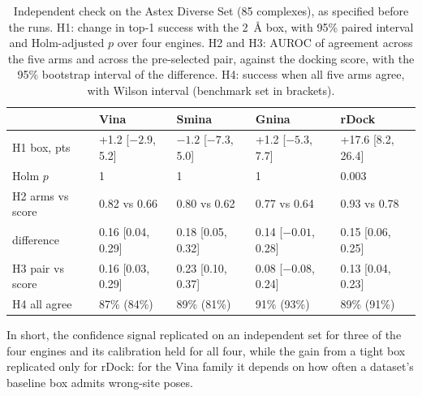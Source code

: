 \begin{table}[h]
  \centering
  \caption{Independent check on the Astex Diverse Set (85 complexes), as specified before the
    runs. H1: change in top-1 success with the \SI{2}{\angstrom} box, with 95\% paired
    interval and Holm-adjusted $p$ over four engines. H2 and H3: AUROC of agreement across the
    five arms and across the pre-selected pair, against the docking score, with the 95\%
    bootstrap interval of the difference. H4: success when all five arms agree, with Wilson
    interval (benchmark set in brackets).}
  \label{tab:astex}
  \small
  \setlength{\tabcolsep}{3.5pt}
  \begin{tabular}{lllll}
    \toprule
     & Vina & Smina & Gnina & rDock \\
    \midrule
    H1 box, pts & +1.2 [$-2.9$, 5.2] & $-1.2$ [$-7.3$, 5.0] & +1.2 [$-5.3$, 7.7] & +17.6 [8.2, 26.4] \\
    \quad Holm $p$ & 1 & 1 & 1 & 0.003 \\
    H2 arms vs score & 0.82 vs 0.66 & 0.80 vs 0.62 & 0.77 vs 0.64 & 0.93 vs 0.78 \\
    \quad difference & 0.16 [0.04, 0.29] & 0.18 [0.05, 0.32] & 0.14 [$-0.01$, 0.28] & 0.15 [0.06, 0.25] \\
    H3 pair vs score & 0.16 [0.03, 0.29] & 0.23 [0.10, 0.37] & 0.08 [$-0.08$, 0.24] & 0.13 [0.04, 0.23] \\
    H4 all agree & 87\% (84\%) & 89\% (81\%) & 91\% (93\%) & 89\% (91\%) \\
    \bottomrule
  \end{tabular}
\end{table}

In short, the confidence signal replicated on an independent set for three of the four engines
and its calibration held for all four, while the gain from a tight box replicated only for
rDock: for the Vina family it depends on how often a dataset's baseline box admits wrong-site
poses.
